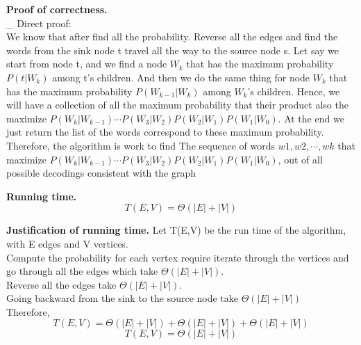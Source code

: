 \documentclass[11pt]{article}
\begin{document}
\Large{}
\noindent
\textbf{Proof of correctness.}\\
\_ Direct proof:\\
We know that after find all the probability. Reverse all the edges and find the words from the sink node t travel all the way to the source node s. Let say we start from node t, and we find a node $W_k$  that has the maximum probability $P(t|W_k)$ among t's children. And then we do the same thing for node $W_k$ that has the maximum probability $P(W_{k-1}|W_k)$ among  $W_k$'s children. Hence, we will have a collection of all the maximum probability that their product also the maximize $P(W_k|W_{k-1}) \cdots P(W_3|W_2)P(W_2|W_1)P(W_1|W_0)$. At the end we just return the list of the words correspond to these maximum probability. Therefore, the algorithm is work to find The sequence of words $w1, w2, \cdots   ,wk$ that maximize $P(W_k|W_{k-1}) \cdots P(W_3|W_2)P(W_2|W_1)P(W_1|W_0)$, out of all possible decodings consistent with the graph

\noindent
\textbf{Running time.}
$$\boxed{T(E,V) = \Theta(|E| + |V|)}$$

\noindent
\textbf{Justification of running time.}
Let T(E,V) be the run time of the algorithm, with E edges and V vertices.\\
Compute the probability for each vertex require iterate through the vertices and go through all the edges which take $\Theta(|E| + |V|)$.\\
Reverse all the edges take $\Theta(|E| + |V|)$.\\
Going backward from the sink to the source node take $\Theta(|E| + |V|)$\\
Therefore, 
$$T(E,V) = \Theta(|E| + |V|) + \Theta(|E| + |V|) + \Theta(|E| + |V|)$$
$$\boxed{T(E,V) = \Theta(|E| + |V|)}$$
\end{document}
